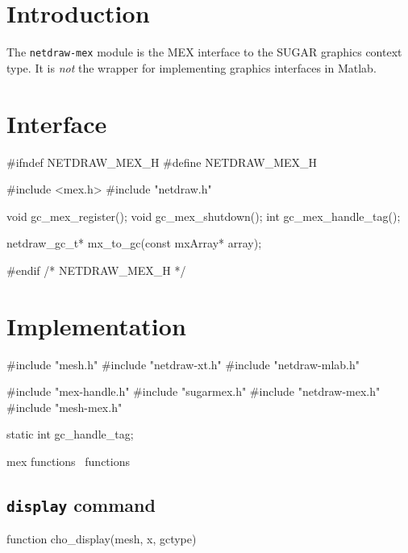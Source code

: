 
\section{Introduction}

The {\tt{}netdraw-mex} module is the MEX interface to the SUGAR graphics
context type.  It is \emph{not} the wrapper for implementing graphics
interfaces in Matlab.


\section{Interface}

\endmoddef
#ifndef NETDRAW_MEX_H
#define NETDRAW_MEX_H

#include <mex.h>
#include "netdraw.h"

void gc_mex_register();
void gc_mex_shutdown();
int  gc_mex_handle_tag();

netdraw_gc_t* mx_to_gc(const mxArray* array);

#endif /* NETDRAW_MEX_H */
\nwendcode{}\nwdocspar


\section{Implementation}

\nwenddocs{}\endmoddef
#include "mesh.h"
#include "netdraw-xt.h"
#include "netdraw-mlab.h"

#include "mex-handle.h"
#include "sugarmex.h"
#include "netdraw-mex.h"
#include "mesh-mex.h"

static int gc_handle_tag;

\LA{}mex functions~{\nwtagstyle{}}\RA{}
\LA{}functions~{\nwtagstyle{}}\RA{}
\nwendcode{}\nwdocspar


\subsection{{\tt{}display} command}

\nwenddocs{}\endmoddef
function cho_display(mesh, x, gctype)

